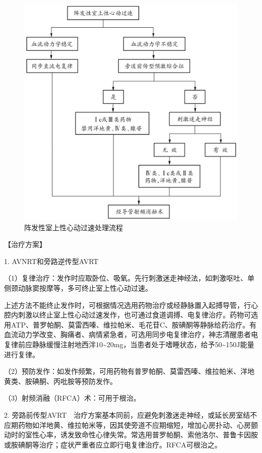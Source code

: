 \begin{figure}[!htbp]
 \centering
 \includegraphics{./images/Image00060.jpg}
 \captionsetup{justification=centering}
 \caption{阵发性室上性心动过速处理流程}
 \label{fig2-2-15}
  \end{figure} 

【治疗方案】

1. AVNRT和旁路逆传型AVRT

（1）复律治疗：发作时应取卧位、吸氧。先行刺激迷走神经法，如刺激呕吐、单侧颈动脉窦按摩等，多可终止室上性心动过速。

上述方法不能终止发作时，可根据情况选用药物治疗或经静脉置入起搏导管，行心腔内刺激以终止室上性心动过速发作，也可通过食道调搏、电复律治疗。药物可选用ATP、普罗帕酮、莫雷西嗪、维拉帕米、毛花苷C、胺碘酮等静脉给药治疗。有血流动力学改变、胸痛者、病情紧急者，可选用同步电复律治疗，神志清醒患者电复律前应静脉缓慢注射地西泮10\textasciitilde{}20mg，当患者处于嗜睡状态，给予50\textasciitilde{}150J能量进行复律。

（2）预防发作：如发作频繁，可用药物有普罗帕酮、莫雷西嗪、维拉帕米、洋地黄类、胺碘酮、丙吡胺等预防发作。

（3）射频消融（RFCA）术：可用于根治。

2.
旁路前传型AVRT　治疗方案基本同前，应避免刺激迷走神经，或延长房室结不应期药物如洋地黄、维拉帕米等，因其使旁道不应期缩短，增加心房扑动、心房颤动时的室性心率，诱发致命性心律失常。常选用普罗帕酮、索他洛尔、普鲁卡因胺或胺碘酮等治疗；症状严重者应立即行电复律治疗。RFCA可根治之。

